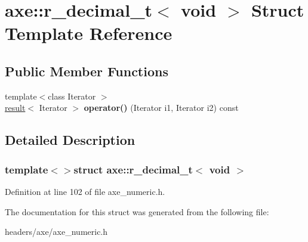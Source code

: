 \hypertarget{structaxe_1_1r__decimal__t_3_01void_01_4}{\section{axe\+:\+:r\+\_\+decimal\+\_\+t$<$ void $>$ Struct Template Reference}
\label{structaxe_1_1r__decimal__t_3_01void_01_4}
}
\subsection*{Public Member Functions}
\begin{DoxyCompactItemize}
\item 
\hypertarget{structaxe_1_1r__decimal__t_3_01void_01_4_aaf8c019978bd3c5fdeb791f0558d281e}{{\footnotesize template$<$class Iterator $>$ }\\\hyperlink{structaxe_1_1result}{result}$<$ Iterator $>$ {\bfseries operator()} (Iterator i1, Iterator i2) const }\label{structaxe_1_1r__decimal__t_3_01void_01_4_aaf8c019978bd3c5fdeb791f0558d281e}

\end{DoxyCompactItemize}


\subsection{Detailed Description}
\subsubsection*{template$<$$>$struct axe\+::r\+\_\+decimal\+\_\+t$<$ void $>$}



Definition at line 102 of file axe\+\_\+numeric.\+h.



The documentation for this struct was generated from the following file\+:\begin{DoxyCompactItemize}
\item 
headers/axe/axe\+\_\+numeric.\+h\end{DoxyCompactItemize}
